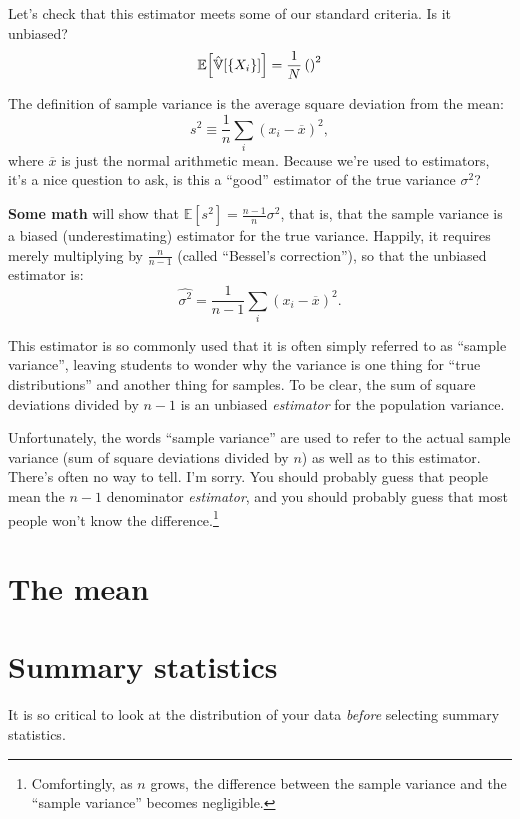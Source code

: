 Let's check that this estimator meets some of our standard criteria. Is it
unbiased?
\begin{align*}
\mathbb{E}\!\left[{\hat{\mathbb{V}}[\{X_i\}]}\right] =
  \frac{1}{N} \left(  \right)^2
\end{align*}

The definition of sample variance is the average square deviation from
the mean: \[
s^2 \equiv \frac{1}{n} \sum_i (x_i - \overline{x})^2,
\] where \(\overline{x}\) is just the normal arithmetic mean. Because
we're used to estimators, it's a nice question to ask, is this a
``good'' estimator of the true variance \(\sigma^2\)?

\textbf{Some math} will show that
\(\mathbb{E}[s^2] = \tfrac{n-1}{n} \sigma^2\), that is, that the sample
variance is a biased (underestimating) estimator for the true variance.
Happily, it requires merely multiplying by \(\tfrac{n}{n-1}\) (called
``Bessel's correction''), so that the unbiased estimator is: \[
\hat{\sigma^2} = \frac{1}{n-1} \sum_i (x_i - \overline{x})^2.
\]

This estimator is so commonly used that it is often simply referred to
as ``sample variance'', leaving students to wonder why the variance is
one thing for ``true distributions'' and another thing for samples. To
be clear, the sum of square deviations divided by \(n-1\) is an unbiased
\emph{estimator} for the population variance.

Unfortunately, the words ``sample variance'' are used to refer to the
actual sample variance (sum of square deviations divided by \(n\)) as
well as to this estimator. There's often no way to tell. I'm sorry. You
should probably guess that people mean the \(n-1\) denominator
\emph{estimator}, and you should probably guess that most people won't
know the difference.\footnote{Comfortingly, as \(n\) grows, the
  difference between the sample variance and the ``sample variance''
  becomes negligible.}

\section{The mean}


\section{Summary statistics}\label{summary-statistics}

It is so critical to look
at the distribution of your data \emph{before} selecting summary
statistics.

